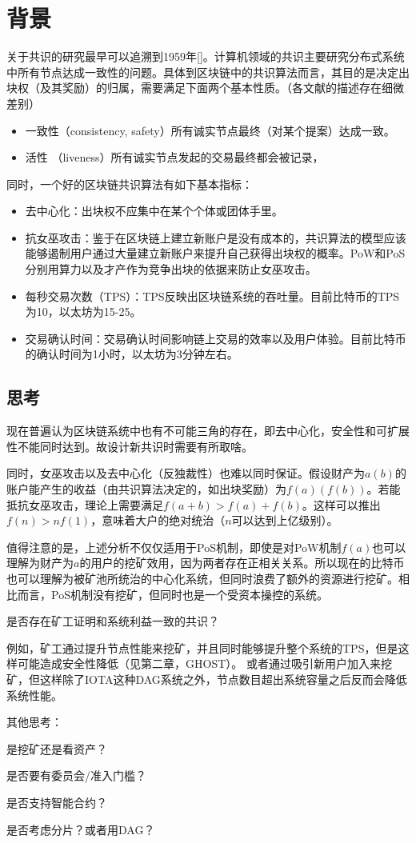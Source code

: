\section{背景}
关于共识的研究最早可以追溯到1959年[]。计算机领域的共识主要研究分布式系统中所有节点达成一致性的问题。具体到区块链中的共识算法而言，其目的是决定出块权（及其奖励）的归属，需要满足下面两个基本性质。（各文献的描述存在细微差别）

\begin{itemize}
\item 一致性（consistency, safety）所有诚实节点最终（对某个提案）达成一致。
\item 活性 （liveness）所有诚实节点发起的交易最终都会被记录，
\end{itemize}
同时，一个好的区块链共识算法有如下基本指标：
\begin{itemize}
\item 去中心化：出块权不应集中在某个个体或团体手里。
\item 抗女巫攻击：鉴于在区块链上建立新账户是没有成本的，共识算法的模型应该能够遏制用户通过大量建立新账户来提升自己获得出块权的概率。PoW和PoS分别用算力以及才产作为竞争出块的依据来防止女巫攻击。
\item 每秒交易次数（TPS）：TPS反映出区块链系统的吞吐量。目前比特币的TPS为10，以太坊为15-25。
\item 交易确认时间：交易确认时间影响链上交易的效率以及用户体验。目前比特币的确认时间为1小时，以太坊为3分钟左右。
\end{itemize}

\subsection{思考}
现在普遍认为区块链系统中也有不可能三角的存在，即去中心化，安全性和可扩展性不能同时达到。故设计新共识时需要有所取啥。

同时，女巫攻击以及去中心化（反独裁性）也难以同时保证。假设财产为$a(b)$的账户能产生的收益（由共识算法决定的，如出块奖励）为$f(a)(f(b))$。若能抵抗女巫攻击，理论上需要满足$f(a+b)>f(a)+f(b)$。这样可以推出$f(n)>nf(1)$，意味着大户的绝对统治（$n$可以达到上亿级别）。

值得注意的是，上述分析不仅仅适用于PoS机制，即使是对PoW机制$f(a)$也可以理解为财产为$a$的用户的挖矿效用，因为两者存在正相关关系。所以现在的比特币也可以理解为被矿池所统治的中心化系统，但同时浪费了额外的资源进行挖矿。相比而言，PoS机制没有挖矿，但同时也是一个受资本操控的系统。

{\color{red}是否存在矿工证明和系统利益一致的共识？}

例如，矿工通过提升节点性能来挖矿，并且同时能够提升整个系统的TPS，但是这样可能造成安全性降低（见第二章，GHOST）。 或者通过吸引新用户加入来挖矿，但这样除了IOTA这种DAG系统之外，节点数目超出系统容量之后反而会降低系统性能。

其他思考：

是挖矿还是看资产？

是否要有委员会/准入门槛？

是否支持智能合约？

是否考虑分片？或者用DAG？

